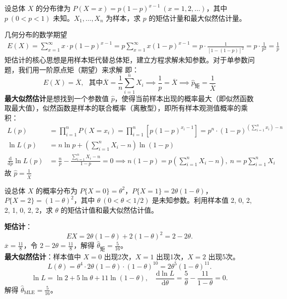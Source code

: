 \documentclass[lang=cn,11pt]{elegantbook}
\begin{document}
\begin{exercise}\label{exer:7-geometric}
设总体 \(X\) 的分布律为 \(P(X=x) = p(1-p)^{x-1}\ (x=1,2,\dots)\)，其中 \(p\ (0<p<1)\) 未知。\(X_1, \dots, X_n\) 为样本，求 \(p\) 的矩估计量和最大似然估计量。
\end{exercise}
\begin{solution}
几何分布的数学期望
\begin{align*}
E(X) = \sum_{x=1}^\infty x \cdot p(1-p)^{x-1} = p \sum_{x=1}^\infty x(1-p)^{x-1} = p \cdot \frac{1}{[1-(1-p)]^2} = p \cdot \frac{1}{p^2} = \frac{1}{p}
\end{align*}
矩估计的核心思想是用样本矩代替总体矩，建立方程求解未知参数。对于单参数问题，我们用一阶原点矩（期望）来求解
即：
$$E(X) = \overline{X},~~~\text{其中}\overline{X} = \frac{1}{n}\sum_{i=1}^n X_i\implies \frac1p=\overline{X}\implies \hat{p}_{\text{矩}} = \frac1{\overline{X}}$$
\textbf{最大似然估计}是想找到一个参数值 $\hat{p}$，使得当前样本出现的概率最大（即似然函数取最大值），似然函数是样本的联合概率（离散型），即所有样本观测值概率的乘积：
\begin{align*}
L(p) &= \prod_{i=1}^n P(X=x_i) = \prod_{i=1}^n \left[ p(1-p)^{x_i-1} \right]=  p^n \cdot (1-p)^{\left( \sum_{i=1}^n x_i \right) - n}\\
\ln L(p) &= n\ln p + \left( \sum_{i=1}^n X_i - n \right) \ln(1-p)\\
\frac{\mathrm{d}}{\mathrm{d}p} \ln L(p) &= \frac{n}{p} - \frac{\sum_{i=1}^n X_i - n}{1-p} = 0\implies n(1-p) = p\left( \sum_{i=1}^n X_i - n \right),~n = p\sum_{i=1}^n X_i
\end{align*}
故 \(\hat{p} = \frac{1}{\overline{X}}\)
\end{solution}

\begin{exercise}\label{exer:7-discrete-3val}
设总体 \(X\) 的概率分布为 \(P\{X=0\} = \theta^2\)，\(P\{X=1\} = 2\theta(1-\theta)\)，\(P\{X=2\} = (1-\theta)^2\)，其中 \(\theta\ (0 < \theta < 1/2)\) 是未知参数。利用样本值 2, 0, 2, 2, 1, 0, 2, 2，求 \(\theta\) 的矩估计值和最大似然估计值。
\end{exercise}
\begin{solution}
\textbf{矩估计}：
\[
EX = 2\theta(1-\theta) + 2(1-\theta)^2 = 2-2\theta.
\]
\(\overline{x} = \frac{11}{8}\)，令 \(2-2\theta = \frac{11}{8}\)，解得 \(\hat{\theta}_{\text{矩}} = \frac{5}{16}\)。\\
\textbf{最大似然估计}：样本值中 \(X=0\) 出现2次，\(X=1\) 出现1次，\(X=2\) 出现5次。
\[
L(\theta) = \theta^4\cdot2\theta(1-\theta)\cdot(1-\theta)^{10} = 2\theta^5(1-\theta)^{11}.
\]
\[
\ln L = \ln 2 + 5\ln\theta + 11\ln(1-\theta),\quad \frac{\mathrm{d}\ln L}{\mathrm{d}\theta} = \frac{5}{\theta} - \frac{11}{1-\theta} = 0.
\]
解得 \(\hat{\theta}_{\text{MLE}} = \frac{5}{16}\)。
\end{solution}
\end{document}

